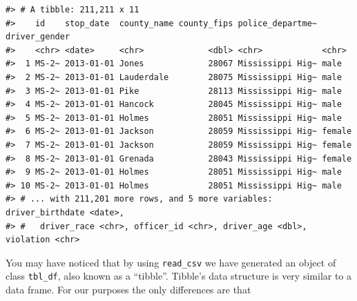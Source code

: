 \documentclass[
]{book}
\begin{document}
\begin{verbatim}
#> # A tibble: 211,211 x 11
#>    id    stop_date  county_name county_fips police_departme~ driver_gender
#>    <chr> <date>     <chr>             <dbl> <chr>            <chr>        
#>  1 MS-2~ 2013-01-01 Jones             28067 Mississippi Hig~ male         
#>  2 MS-2~ 2013-01-01 Lauderdale        28075 Mississippi Hig~ male         
#>  3 MS-2~ 2013-01-01 Pike              28113 Mississippi Hig~ male         
#>  4 MS-2~ 2013-01-01 Hancock           28045 Mississippi Hig~ male         
#>  5 MS-2~ 2013-01-01 Holmes            28051 Mississippi Hig~ male         
#>  6 MS-2~ 2013-01-01 Jackson           28059 Mississippi Hig~ female       
#>  7 MS-2~ 2013-01-01 Jackson           28059 Mississippi Hig~ female       
#>  8 MS-2~ 2013-01-01 Grenada           28043 Mississippi Hig~ female       
#>  9 MS-2~ 2013-01-01 Holmes            28051 Mississippi Hig~ male         
#> 10 MS-2~ 2013-01-01 Holmes            28051 Mississippi Hig~ male         
#> # ... with 211,201 more rows, and 5 more variables: driver_birthdate <date>,
#> #   driver_race <chr>, officer_id <chr>, driver_age <dbl>, violation <chr>
\end{verbatim}

You may have noticed that by using \texttt{read\_csv} we have generated an object
of class \texttt{tbl\_df}, also known as a ``tibble''. Tibble's data
structure is very similar to a data frame. For our purposes the only differences
are that
\end{document}
